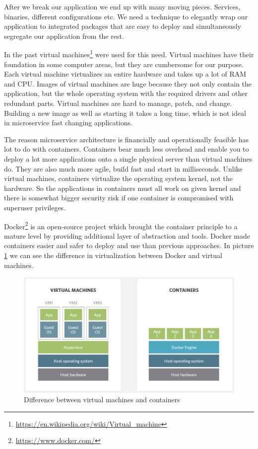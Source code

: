 \documentclass[12pt,oneside]{fithesis2}
\begin{document}
After we break our application we end up with many moving pieces. Services, binaries, different configurations etc. We need a technique to elegantly wrap our application to integrated packages that are easy to deploy and simultaneously segregate our application from the rest.

In the past virtual machines\footnote{\url{https://en.wikipedia.org/wiki/Virtual_machine}} were used for this need. Virtual machines have their foundation in some computer areas, but they are cumbersome for our purpose. Each virtual machine virtualizes an entire hardware and takes up a lot of RAM and CPU. Images of virtual machines are huge because they not only contain the application, but the whole operating system with the required drivers and other redundant parts. Virtual machines are hard to manage, patch, and change. Building a new image as well as starting it takes a long time, which is not ideal in microservice fast changing applications.

The reason microservice architecture is financially and operationally feasible has lot to do with containers. Containers bear much less overhead and enable you to deploy a lot more applications onto a single physical server than virtual machines do. They are also much more agile, build fast and start in milliseconds. Unlike virtual machines, containers virtualize the operating system kernel, not the hardware. So the applications in containers must all work on given kernel and there is somewhat bigger security risk if one container is compromised with superuser privileges.

Docker\footnote{\url{https://www.docker.com/}} is an open-source project which brought the container principle to a mature level by providing additional layer of abstraction and tools. Docker made containers easier and safer to deploy and use than previous approaches. In picture \ref{vm_vs_docker} we can see the difference in virtualization between Docker and virtual machines.

\begin{figure}[ht!]
	\label{vm_vs_docker}
	\centering
	\includegraphics[width=\textwidth]{images/virtual_machines_vs_containers.png}
	\caption{Difference between virtual machines and containers\footnotemark}
\end{figure}
\end{document}
